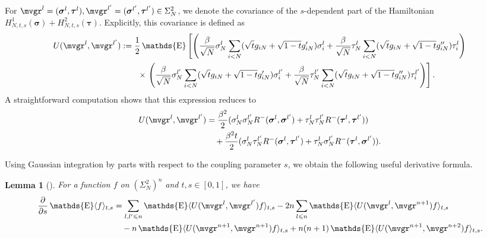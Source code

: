 \documentclass[letterpaper,11pt,reqno]{amsart}
\newtheorem{lem}[thm]{Lemma}
\renewcommand{\leq}{\leqslant}
\newcommand{\ra}{\rangle}
\newcommand{\la}{\langle}
\newcommand{\mvgs}{\boldsymbol{\sigma}}\newcommand{\mvgS}{\boldsymbol{\Sigma}}\newcommand{\mvgt}{\boldsymbol{\tau}}
\DeclareMathOperator{\E}{\mathds{E}}
\begin{document}
For \( \mvgr^l = (\mvgs^l, \mvgt^l), \mvgr^{l'} = (\mvgs^{l'}, \mvgt^{l'}) \in \Sigma_{N}^2\), we denote the covariance of the $s$-dependent part of the Hamiltonian $H_{N,t,s}^1(\mvgs) + H_{N,t,s}^2(\mvgt)$. Explicitly, this covariance is defined as
\begin{align*}
    U(\mvgr^l, \mvgr^{l'}) 
    &:= \frac{1}{2} \E \left[ \left( \frac{\beta}{\sqrt{N}} \sigma_N^l \sum_{i<N} (\sqrt{t}g_{iN} + \sqrt{1-t}g_{iN}') \sigma_i^l + \frac{\beta}{\sqrt{N}} \tau_N^l \sum_{i<N} (\sqrt{t}g_{iN} + \sqrt{1-t}g_{iN}'') \tau_i^l \right) \right. \\
    &\qquad \times  \left. \left( \frac{\beta}{\sqrt{N}} \sigma_N^{l'} \sum_{i<N} (\sqrt{t}g_{iN} + \sqrt{1-t}g_{iN}') \sigma_i^{l'} + \frac{\beta}{\sqrt{N}} \tau_N^{l'} \sum_{i<N} (\sqrt{t}g_{iN} + \sqrt{1-t}g_{iN}'') \tau_i^{l'} \right) \right].
\end{align*}
A straightforward computation shows that this expression reduces to
\begin{align*}
    U(\mvgr^l, \mvgr^{l'})
    &= \frac{\beta^2 }{2} ( \sigma_N^l \sigma_N^{l'} R^-(\mvgs^l, \mvgs^{l'}) + \tau_N^l \tau_N^{l'} R^-(\mvgt^l, \mvgt^{l'})) \nonumber \\
    &\quad + \frac{\beta^2 t}{2} ( \sigma_N^l \tau_N^{l'} R^-(\mvgs^l, \mvgt^{l'}) + \tau_N^l \sigma_N^{l'} R^-(\mvgt^l, \mvgs^{l'})).
\end{align*}



Using Gaussian integration by parts with respect to the coupling parameter $s$, we obtain the following useful derivative formula.

\begin{lem}[{\cite[Eq.~(1.90)]{Tal1}}] \label{lem:gauss_ibp}
    For a function \(f\) on \((\Sigma_{N}^2)^n\) and \(t,s \in [0,1]\), we have
    \begin{align*}
        \frac{\partial}{\partial s} \E \la f \ra_{t,s} 
        &= \sum_{l, l' \leq n} \E \la U(\mvgr^l, \mvgr^{l'})f \ra_{t,s}
        - 2n \sum_{l \leq n} \E \la U(\mvgr^l, \mvgr^{n+1})f \ra_{t,s} \\
        &\quad - n \E \la U(\mvgr^{n+1}, \mvgr^{n+1})f \ra_{t,s}
         + n(n+1) \E \la U(\mvgr^{n+1}, \mvgr^{n+2})f \ra_{t,s}.
    \end{align*}
\end{lem}
\end{document}

